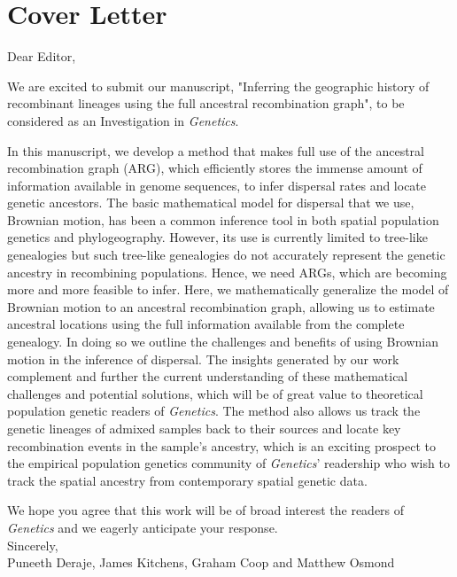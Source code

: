 \section*{Cover Letter}

Dear Editor, 

We are excited to submit our manuscript, "Inferring the geographic history of recombinant
lineages using the full ancestral recombination graph", to be considered as an Investigation in \textit{Genetics}. 

In this manuscript, we develop a method that makes full use of the ancestral recombination graph (ARG), which efficiently stores the immense amount of information available in genome sequences, to infer dispersal rates and locate genetic ancestors. The basic mathematical model for dispersal that we use, Brownian motion, has been a common inference tool in both spatial population genetics and phylogeography. However, its use is currently limited to tree-like genealogies but such tree-like genealogies do not accurately represent the genetic ancestry in recombining populations. Hence, we need ARGs, which are becoming more and more feasible to infer. Here, we mathematically generalize the model of Brownian motion to an ancestral recombination graph, allowing us to estimate ancestral locations using the full information available from the complete genealogy. In doing so we outline the challenges and benefits of using Brownian motion in the inference of dispersal. The insights generated by our work complement and further the current understanding of these mathematical challenges and potential solutions, which will be of great value to theoretical population genetic readers of \textit{Genetics}. The method also allows us track the genetic lineages of admixed samples back to their sources and locate key recombination events in the sample's ancestry, which is an exciting prospect to the empirical population genetics community of \textit{Genetics}' readership who wish to track the spatial ancestry from contemporary spatial genetic data.

We hope you agree that this work will be of broad interest the readers of \textit{Genetics} and we eagerly anticipate your response. \\
Sincerely, \\
Puneeth Deraje, James Kitchens, Graham Coop and Matthew Osmond